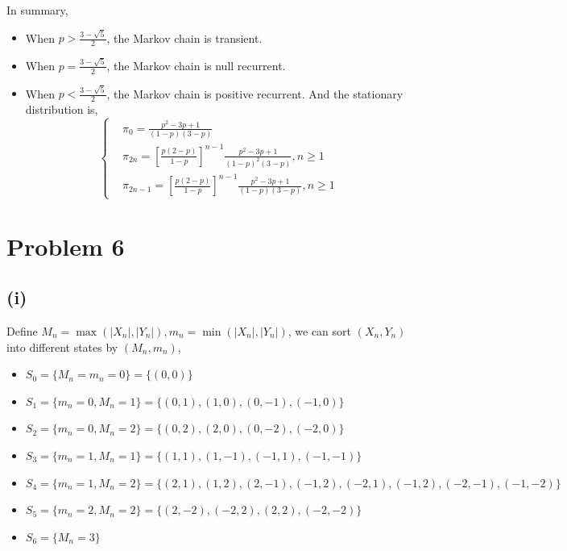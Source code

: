 \documentclass{article}
\begin{document}
In summary,

\begin{itemize}
    \item When $p>\frac{3-\sqrt{5}}{2}$, the Markov chain is transient.
    \item When $p=\frac{3-\sqrt{5}}{2}$, the Markov chain is null recurrent.
    \item When $p<\frac{3-\sqrt{5}}{2}$, the Markov chain is positive recurrent. And the stationary distribution is, \begin{equation}
        \left\{\begin{aligned}
            &\pi_0 = \frac{p^2-3p+1}{(1-p)(3-p)} \\
            &\pi_{2n} = \left[\frac{p(2-p)}{1-p}\right]^{n-1}  \frac{p^2-3p+1}{(1-p)^2(3-p)},n\geqslant 1 \\
            & \pi_{2n-1} = \left[\frac{p(2-p)}{1-p}\right]^{n-1}  \frac{p^2-3p+1}{(1-p)(3-p)},n\geqslant 1
        \end{aligned}
            \right.
    \end{equation}
\end{itemize}


\section{Problem 6}

\subsection{(i)}

Define $M_n = \max(|X_n|,|Y_n|),m_n = \min(|X_n|,|Y_n|)$, we can sort $(X_n,Y_n)$ into different states by $(M_n,m_n)$,

\begin{itemize}
    \item $S_0 = \{M_n = m_n = 0\} = \{(0,0)\}$
    \item $S_1 = \{m_n = 0,M_n = 1\} = \{(0,1),(1,0),(0,-1),(-1,0)\}$
    \item $S_2 = \{m_n = 0,M_n = 2\} = \{(0,2),(2,0),(0,-2),(-2,0)\}$
    \item $S_3 = \{m_n = 1,M_n = 1\} = \{(1,1),(1,-1),(-1,1),(-1,-1)\}$
    \item $S_4 = \{m_n = 1,M_n = 2\} = \{(2,1),(1,2),(2,-1),(-1,2),(-2,1),(-1,2),(-2,-1),(-1,-2)\}$
    \item $S_5 = \{m_n = 2,M_n=2 \} = \{(2,-2),(-2,2),(2,2),(-2,-2)\}$ 
    \item $S_6 = \{M_n= 3\}$
\end{itemize}
\end{document}
